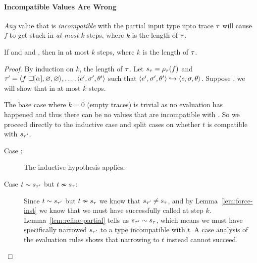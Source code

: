 \paragraph{Incompatible Values Are Wrong}
%
\emph{Any} value that is \emph{incompatible} with
the partial input type upto trace $\tau$ will cause $f$ to get stuck
in \emph{at most} $k$ steps, where $k$ is the length of $\tau$.
%
\begin{lem}
\label{lem:k-stuck}
  If  and
      and
     ,
  then
     in at most $k$ steps, where $k$ is the length of $\tau$.
\end{lem}
\begin{proof}
  By induction on $k$, the length of $\tau$. Let $s_{\tau} = \rho_{\tau}(f)$ and
  $\tau' = \langle f\ \square[\alpha], \varnothing, \varnothing \rangle,\ldots,\langle e', \sigma', \theta' \rangle$
  such that $\langle e', \sigma', \theta' \rangle \hookrightarrow \langle e, \sigma, \theta \rangle$.
  Suppose , we
  will show that 
  in at most $k$ steps.

  The base case where $k = 0$ (\ie empty traces) is trivial as no
  evaluation has happened and thus there can be no values that are
  incompatible with . So we proceed directly to the
  inductive case and split cases on whether $t$ is compatible with
  $s_{\tau'}$.
  \begin{description}
  \item [Case :]
    The inductive hypothesis applies.
  \item [Case $t \sim s_{\tau'}$ but $t \nsim s_{\tau}$:]
    Since $t \sim s_{\tau'}$ but $t \nsim s_{\tau}$ we know
    that $s_{\tau'} \neq s_{\tau}$, and
    by Lemma~\ref{lem:force-inst} we know that we must have
    successfully called \forcesym at step $k$.
    Lemma~\ref{lem:refine-partial} tells us
    $s_{\tau'} \sim s_{\tau}$, which means we must have
    specifically narrowed $s_{\tau'}$ to a type incompatible with $t$.
    A case analysis of the evaluation rules shows that narrowing to
    $t$ instead cannot succeed.
  \end{description}
\end{proof}

